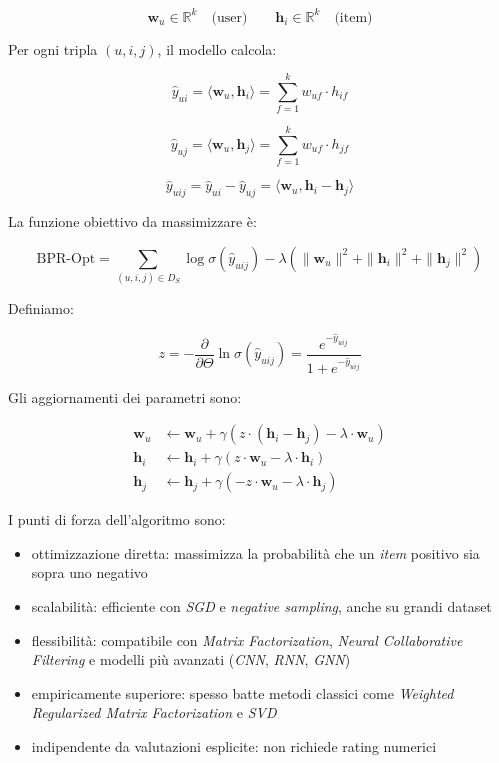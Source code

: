 \[
\mathbf{w}_u \in \mathbb{R}^k \quad \text{(user)} \qquad
\mathbf{h}_i \in \mathbb{R}^k \quad \text{(item)}
\]


Per ogni tripla $(u, i, j)$, il modello calcola:

\[
\hat{y}_{ui} = \langle \mathbf{w}_u, \mathbf{h}_i \rangle = \sum_{f=1}^{k} w_{uf} \cdot h_{if}
\]

\[
\hat{y}_{uj} = \langle \mathbf{w}_u, \mathbf{h}_j \rangle = \sum_{f=1}^{k} w_{uf} \cdot h_{jf}
\]

\[
\hat{y}_{uij} = \hat{y}_{ui} - \hat{y}_{uj} = \langle \mathbf{w}_u, \mathbf{h}_i - \mathbf{h}_j \rangle
\]


La funzione obiettivo da massimizzare è:

\[
\text{BPR-Opt} = \sum_{(u,i,j) \in D_S} \log \sigma(\hat{y}_{uij}) 
- \lambda \left( \|\mathbf{w}_u\|^2 + \|\mathbf{h}_i\|^2 + \|\mathbf{h}_j\|^2 \right)
\]

Definiamo:

\[
z = -\frac{\partial}{\partial \Theta} \ln \sigma(\hat{y}_{uij}) = \frac{e^{-\hat{y}_{uij}}}{1 + e^{-\hat{y}_{uij}}}
\]

Gli aggiornamenti dei parametri sono:

\begin{align*}
\mathbf{w}_u &\leftarrow \mathbf{w}_u + \gamma \left( z \cdot (\mathbf{h}_i - \mathbf{h}_j) - \lambda \cdot \mathbf{w}_u \right) \\
\mathbf{h}_i &\leftarrow \mathbf{h}_i + \gamma \left( z \cdot \mathbf{w}_u - \lambda \cdot \mathbf{h}_i \right) \\
\mathbf{h}_j &\leftarrow \mathbf{h}_j + \gamma \left( -z \cdot \mathbf{w}_u - \lambda \cdot \mathbf{h}_j \right)
\end{align*}

I punti di forza dell'algoritmo sono:

\begin{itemize}
    \item ottimizzazione diretta: massimizza la probabilità che un \textit{item} positivo sia sopra uno negativo
    \item scalabilità: efficiente con \textit{SGD} e \textit{negative sampling}, anche su grandi dataset
    \item flessibilità: compatibile con \textit{Matrix Factorization}, \textit{Neural Collaborative Filtering} e modelli più avanzati (\textit{CNN}, \textit{RNN}, \textit{GNN})
    \item empiricamente superiore: spesso batte metodi classici come \textit{Weighted Regularized Matrix Factorization} e \textit{SVD}
    \item indipendente da valutazioni esplicite: non richiede rating numerici
\end{itemize}

